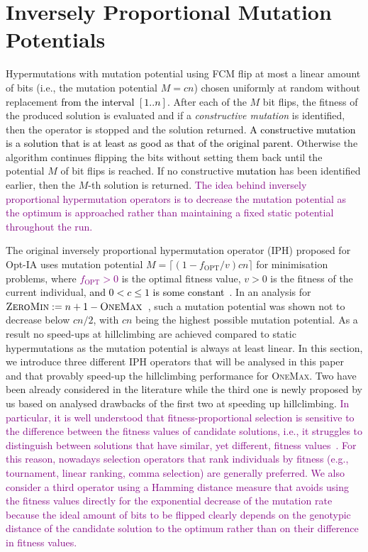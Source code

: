 \documentclass[lettersize,journal]{IEEEtran}
\newcommand{\new}[1]{\textcolor{black}{#1}}
\newcommand{\rerev}[1]{\textcolor{purple}{#1}}
\newcommand{\rev}[1]{\textcolor{black}{#1}}
\newcommand{\IPHfcm}{IPH}
\begin{document}
 \section{Inversely Proportional Mutation Potentials} Hypermutations with mutation potential using FCM flip at most a linear amount of bits (i.e., the mutation potential $M=cn$) chosen uniformly at random without replacement \new{from the interval $[1..n]$}. After each of the $M$ bit flips, the fitness of the produced solution is evaluated and if a {\it constructive mutation} is identified, then the operator is stopped and the solution returned. \new{A  constructive mutation is a solution that is at least as good as that of the original parent.}
 Otherwise the algorithm continues flipping the bits without setting them back until the potential $M$ of bit flips is reached. If no constructive \new{mutation} has been identified earlier, then the $M$-th solution is returned.  
 \rerev{The idea behind inversely proportional hypermutation operators is to decrease the mutation potential as the optimum is approached rather than maintaining a fixed static potential throughout the run.}
 
The original inversely proportional hypermutation operator (\IPHfcm{}) proposed for Opt-IA uses mutation potential  $M=\lceil(1-f_{\text{OPT}}/v)cn\rceil $ for minimisation problems, where \rerev{$f_{\text{OPT}} > 0$} is the optimal fitness value, $v>0$ is the fitness of the current individual, 
 \new{and $0<c\leq 1$ is some constant}~\cite{CutelloNicosiaPavoneTimmis2007,JansenZarges2011}. 
In an analysis for \rev{$\textsc{ZeroMin}:=n+1-\textsc {OneMax}$}~\cite{JansenZarges2011}, such a mutation potential was shown not to decrease below $cn/2$, with $cn$ being the highest possible mutation potential.
 	As a result no speed-ups at hillclimbing are achieved compared to static hypermutations as the mutation potential is always at least linear.
 In this section, we introduce three different IPH operators  that will be analysed in this paper and that provably speed-up the hillclimbing  performance for \textsc{OneMax}. Two have been already considered in the literature while the third one is newly proposed by us based on analysed drawbacks of the first two at speeding up hillclimbing.
 \rerev{In particular, it is well understood that fitness-proportional selection is sensitive to the difference between the fitness values of candidate solutions, i.e., it struggles to distinguish between solutions that have similar, yet different, fitness values~\cite{OlivetoWittTCS2014,OlivetoWitt2015,Whitley1989,NeumannOlivetoWitt2009}. For this reason, nowadays selection operators that rank individuals by fitness (e.g., tournament, linear ranking, comma selection) are generally preferred. We also consider a  third operator using a Hamming distance measure  that  avoids using the fitness values directly for the exponential decrease of the mutation rate because the ideal amount of bits to be flipped clearly depends on the genotypic distance of the candidate solution to the optimum rather than on their difference in fitness values.}
\end{document}
